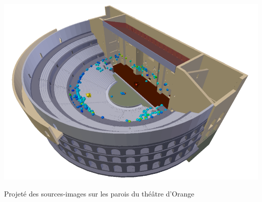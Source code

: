 \begin{figureth}
	\includegraphics[width=0.8\linewidth]{images/projete}
	\caption{Projeté des sources-images sur les parois du théâtre d'Orange}
	\label{projete}
\end{figureth}


